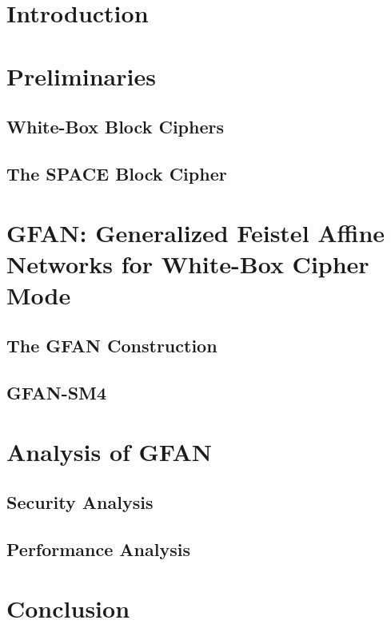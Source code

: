 \documentclass{SCIS2018}
\begin{document}
\section{Introduction}

\section{Preliminaries}
\subsection{White-Box Block Ciphers}

\subsection{The SPACE Block Cipher}

\section{GFAN: Generalized Feistel Affine Networks for White-Box Cipher Mode}

\subsection{The GFAN Construction}

\subsection{GFAN-SM4}

\section{Analysis of GFAN}
\subsection{Security Analysis}

\subsection{Performance Analysis}

\section{Conclusion}

\end{document}

